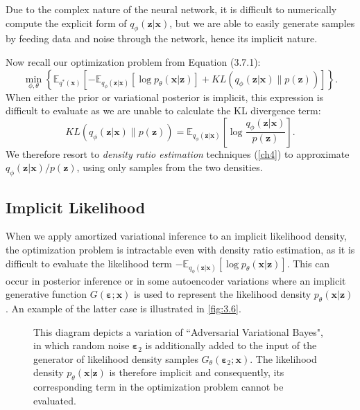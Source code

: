 \documentclass[honours,12pt, twoside]{unswthesis}
\newcommand{\E}{\mathbb{E}}
\numberwithin{equation}{section}
\theoremstyle{definition}
\begin{document}
Due to the complex nature of the neural network, it is difficult to numerically compute the explicit form of $q_\phi(\bm{z}|\bm{x})$, but we are able to easily generate samples by feeding data and noise through the network, hence its implicit nature.

Now recall our optimization problem from Equation (3.7.1):
\[\min_{\phi,\theta} \left\lbrace\mathbb{E}_{q^*(\bm{x})}\left[-\E_{q_\phi(\bm{z}|\bm{x})}[\log p_\theta(\bm{x}|\bm{z})]+KL(q_\phi(\bm{z}|\bm{x})\|p(\bm{z}))\right]\right\rbrace.\]
When either the prior or variational posterior is implicit, this expression is difficult to evaluate as we are unable to calculate the KL divergence term:
\[KL(q_\phi(\bm{z}|\bm{x})\|p(\bm{z}))=\E_{q_\phi(\bm{z}|\bm{x})}\left[\log \frac{q_\phi(\bm{z}|\bm{x})}{p(\bm{z})}\right].\]
We therefore resort to \textit{density ratio estimation} techniques (\autoref{ch4}) to approximate $q_\phi(\bm{z}|\bm{x})/p(\bm{z})$, using only samples from the two densities.
\subsection{Implicit Likelihood}\label{sec:3.8.2}
When we apply amortized variational inference to an implicit likelihood density, the optimization problem is intractable even with density ratio estimation, as it is difficult to evaluate the likelihood term $-\E_{q_\phi(\bm{z}|\bm{x})}[\log p_\theta(\bm{x}|\bm{z})]$. This can occur in posterior inference or in some autoencoder variations where an implicit generative function $G(\bm{\varepsilon};\bm{x})$ is used to represent the likelihood density $p_\theta(\bm{x}|\bm{z})$ \citep{ali}. An example of the latter case is illustrated in \autoref{fig:3.6}.
\begin{figure}[h]
  \centering
   \caption{\small This diagram depicts a variation of ``Adversarial Variational Bayes", in which random noise $\bm{\varepsilon}_2$ is additionally added to the input of the generator of likelihood density samples $G_\theta(\bm{\varepsilon}_2;\bm{x})$. The likelihood density $p_\theta(\bm{x}|\bm{z})$ is therefore implicit and consequently, its corresponding term in the optimization problem cannot be evaluated.}
   \label{fig:3.6}
\end{figure}
\end{document}
